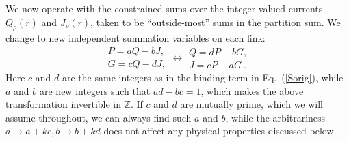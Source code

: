 \documentclass[prb,twocolumn]{revtex4-1}
\def\cJ{{J}}
\def\cQ{{Q}}
\def\cP{{P}}
\def\cG{{G}}
\begin{document}
We now operate with the constrained sums over the integer-valued currents $\cQ_\rho(r)$ and $\cJ_\rho(r)$, taken to be ``outside-most'' sums in the partition sum.  We change to new independent summation variables on each link:\cite{Gen2Loops}
\begin{equation}
\begin{array}{c}
\cP = a \cQ - b \cJ, \\
\cG = c \cQ - d \cJ,
\end{array} 
\leftrightarrow
\begin{array}{c}
\cQ = d \cP - b \cG, \\
\cJ = c \cP - a \cG ~.
\end{array}
\label{SL2Z}
\end{equation}
Here $c$ and $d$ are the same integers as in the binding term in Eq.~(\ref{Sorig}), while $a$ and $b$ are new integers such that $ad - bc = 1$, which makes the above transformation invertible in $\mathbb{Z}$.  If $c$ and $d$ are mutually prime, which we will assume throughout, we can always find such $a$ and $b$, while the arbitrariness $a \to a + kc, b \to b + kd$ does not affect any physical properties discussed below.
\end{document}
